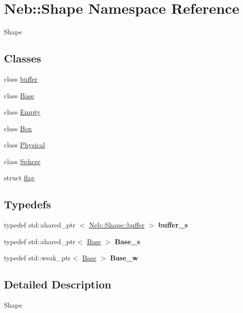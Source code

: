 \hypertarget{namespaceNeb_1_1Shape}{\section{\-Neb\-:\-:\-Shape \-Namespace \-Reference}
\label{namespaceNeb_1_1Shape}
}


\-Shape  


\subsection*{\-Classes}
\begin{DoxyCompactItemize}
\item 
class \hyperlink{classNeb_1_1Shape_1_1buffer}{buffer}
\item 
class \hyperlink{classNeb_1_1Shape_1_1Base}{\-Base}
\item 
class \hyperlink{classNeb_1_1Shape_1_1Empty}{\-Empty}
\item 
class \hyperlink{classNeb_1_1Shape_1_1Box}{\-Box}
\item 
class \hyperlink{classNeb_1_1Shape_1_1Physical}{\-Physical}
\item 
class \hyperlink{classNeb_1_1Shape_1_1Sphere}{\-Sphere}
\item 
struct \hyperlink{structNeb_1_1Shape_1_1flag}{flag}
\end{DoxyCompactItemize}
\subsection*{\-Typedefs}
\begin{DoxyCompactItemize}
\item 
\hypertarget{namespaceNeb_1_1Shape_aa288e6a27ff7da8b5ab5bbe8a4d1a4fe}{typedef std\-::shared\-\_\-ptr\*
$<$ \hyperlink{classNeb_1_1Shape_1_1buffer}{\-Neb\-::\-Shape\-::buffer} $>$ {\bfseries buffer\-\_\-s}}\label{namespaceNeb_1_1Shape_aa288e6a27ff7da8b5ab5bbe8a4d1a4fe}

\item 
\hypertarget{namespaceNeb_1_1Shape_a1c124de9873c83d85982ae0f7e7d042e}{typedef std\-::shared\-\_\-ptr$<$ \hyperlink{classNeb_1_1Shape_1_1Base}{\-Base} $>$ {\bfseries \-Base\-\_\-s}}\label{namespaceNeb_1_1Shape_a1c124de9873c83d85982ae0f7e7d042e}

\item 
\hypertarget{namespaceNeb_1_1Shape_ae81cd4f7d965cb2b232b5855f395c8da}{typedef std\-::weak\-\_\-ptr$<$ \hyperlink{classNeb_1_1Shape_1_1Base}{\-Base} $>$ {\bfseries \-Base\-\_\-w}}\label{namespaceNeb_1_1Shape_ae81cd4f7d965cb2b232b5855f395c8da}

\end{DoxyCompactItemize}


\subsection{\-Detailed \-Description}
\-Shape 